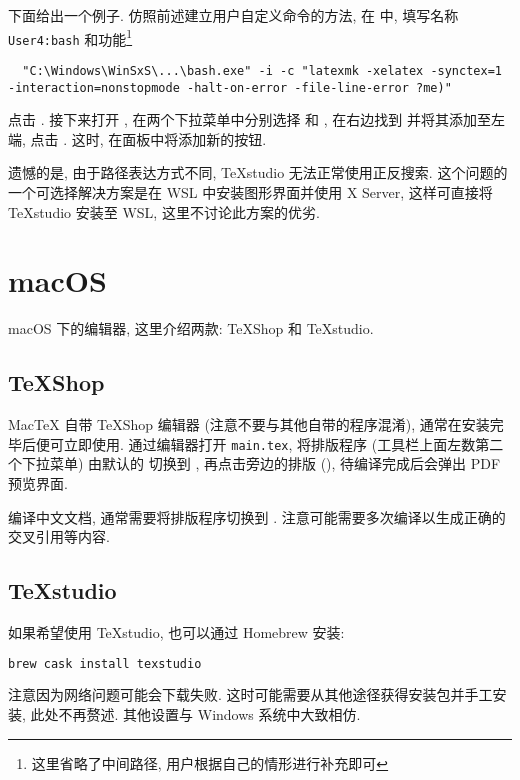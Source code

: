 下面给出一个例子.
仿照前述建立用户自定义命令的方法,
在
中,
填写名称
\texttt{User4:bash}
和功能\footnote{这里省略了中间路径, 用户根据自己的情形进行补充即可}
\begin{lstlisting}
  "C:\Windows\WinSxS\...\bash.exe" -i -c "latexmk -xelatex -synctex=1 -interaction=nonstopmode -halt-on-error -file-line-error ?me)"
\end{lstlisting}
点击 . 
接下来打开 ,
在两个下拉菜单中分别选择  和 ,
在右边找到  并将其添加至左端, 点击 . 
这时, 在面板中将添加新的按钮. 

遗憾的是, 由于路径表达方式不同, \TeX studio 无法正常使用正反搜索.
这个问题的一个可选择解决方案是在 WSL 中安装图形界面并使用 X Server,
这样可直接将 \TeX studio 安装至 WSL,
这里不讨论此方案的优劣.

\section{macOS}

macOS 下的编辑器, 这里介绍两款:
\TeX Shop 和 \TeX studio.

\subsection{\TeX Shop}

Mac\TeX{} 自带 \TeX Shop 编辑器 (注意不要与其他自带的程序混淆),
通常在安装完毕后便可立即使用.
通过编辑器打开 \texttt{main.tex},
将排版程序 (工具栏上面左数第二个下拉菜单) 由默认的  切换到
,
再点击旁边的排版  (),
待编译完成后会弹出 PDF 预览界面.

编译中文文档, 通常需要将排版程序切换到 .
注意可能需要多次编译以生成正确的交叉引用等内容.

\subsection{\TeX studio}

如果希望使用 \TeX studio, 也可以通过 Homebrew 安装:
\begin{lstlisting}[language=bash]
  brew cask install texstudio
\end{lstlisting}
注意因为网络问题可能会下载失败.
这时可能需要从其他途径获得安装包并手工安装, 此处不再赘述.
其他设置与 Windows 系统中大致相仿.

